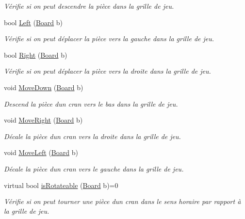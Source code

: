 \begin{DoxyCompactItemize}
\begin{DoxyCompactList}\small\item\em Vérifie si on peut descendre la pièce dans la grille de jeu. \end{DoxyCompactList}\item 
bool \hyperlink{classPiece_aaef48eb5277927bcacace16aaf2d9636}{Left} (\hyperlink{classBoard}{Board} b)
\begin{DoxyCompactList}\small\item\em Vérifie si on peut déplacer la pièce vers la gauche dans la grille de jeu. \end{DoxyCompactList}\item 
bool \hyperlink{classPiece_a44d684a99ea99db740b5bfa73f37ab15}{Right} (\hyperlink{classBoard}{Board} b)
\begin{DoxyCompactList}\small\item\em Vérifie si on peut déplacer la pièce vers la droite dans la grille de jeu. \end{DoxyCompactList}\item 
void \hyperlink{classPiece_a44530e200e9506f7bb4668e82dd91d54}{Move\+Down} (\hyperlink{classBoard}{Board} b)
\begin{DoxyCompactList}\small\item\em Descend la pièce d\textquotesingle{}un cran vers le bas dans la grille de jeu. \end{DoxyCompactList}\item 
void \hyperlink{classPiece_a938328bd15662dbf8d4bd66145e20e1a}{Move\+Right} (\hyperlink{classBoard}{Board} b)
\begin{DoxyCompactList}\small\item\em Décale la pièce d\textquotesingle{}un cran vers la droite dans la grille de jeu. \end{DoxyCompactList}\item 
void \hyperlink{classPiece_a08f2bd761965092bd4f8f97c81aa6af8}{Move\+Left} (\hyperlink{classBoard}{Board} b)
\begin{DoxyCompactList}\small\item\em Décale la pièce d\textquotesingle{}un cran vers le gauche dans la grille de jeu. \end{DoxyCompactList}\item 
virtual bool \hyperlink{classPiece_a56cdf7f4234fe848a3e203b693b7a862}{is\+Rotateable} (\hyperlink{classBoard}{Board} b)=0
\begin{DoxyCompactList}\small\item\em Vérifie si on peut tourner une pièce d\textquotesingle{}un cran dans le sens horaire par rapport à la grille de jeu. \end{DoxyCompactList}\item 

\end{DoxyCompactItemize}
